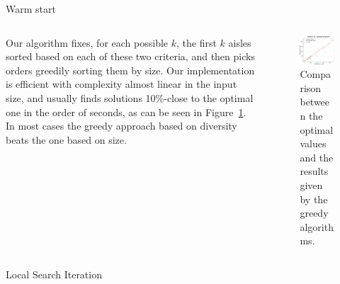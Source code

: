 \documentclass[final]{beamer}
\newlength{\colwidth}
\begin{document}
\begin{frame}[t]
\begin{columns}[t]
\begin{column}{\colwidth}
\begin{block}{Warm start}
    \begin{columns}
  \begin{column}{0.45\textwidth}
  \justify
  Our algorithm fixes, for each possible $k$, the first $k$ aisles sorted based on each of these two criteria, and then picks orders greedily sorting them by size. Our implementation is efficient with complexity almost linear in the input size,
    and usually finds solutions 10\%-close to the optimal one in the order of seconds, as can be seen in Figure~\ref{fig:greedy_vs_optimal}. In most cases the greedy approach based on diversity beats the one based on size.
  \end{column}
  \begin{column}{0.55\textwidth}  %
  \begin{center}
        \begin{figure}
        \includegraphics{greedy_vs_optimal.pdf}
        \caption{Comparison between the optimal values and the results given by the greedy algorithms.}
        \label{fig:greedy_vs_optimal}
      \end{figure}
    \end{center}
     \end{column}
  \end{columns}


    
  \end{block}

  \begin{block}{Local Search Iteration}


\end{block}
\end{column}
\end{columns}
\end{frame}
\end{document}

